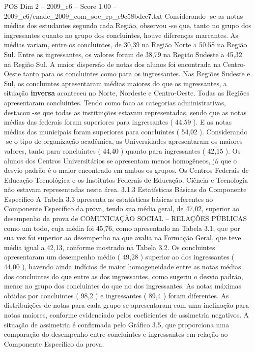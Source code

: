 \begin{textsample}{POS Dim 2 – 2009\_c6 – Score 1.00 – 2009\_c6/enade\_2009\_com\_soc\_rp\_c9c58bdcc7.txt}
Considerando -se as notas médias dos estudantes segundo cada Região, observou -se que, tanto no grupo dos ingressantes quanto no grupo dos concluintes, houve diferenças marcantes.
As médias variam, entre os concluintes, de 30,39 na Região Norte a 50,58 na Região Sul.
Entre os ingressantes, os valores foram de 38,79 na Região Sudeste a 45,32 na Região Sul.
A maior dispersão de notas dos alunos foi encontrada na Centro-Oeste tanto para os concluintes como para os ingressantes.
Nas Regiões Sudeste e Sul, os concluintes apresentaram médias maiores do que os ingressantes, a situação \textbf{inversa} aconteceu no Norte, Nordeste e Centro-Oeste.
Todas as Regiões apresentaram concluintes.
Tendo como foco as categorias administrativas, destacou -se que todas as instituições estavam representadas, sendo que as notas médias das federais foram superiores para ingressantes ( 44,59 ).
E as notas médias das municipais foram superiores para concluintes ( 54,02 ).
Considerando -se o tipo de organização acadêmica, as Universidades apresentaram os maiores valores, tanto para concluintes ( 44,40 ) quanto para ingressantes ( 42,15 ).
Os alunos dos Centros Universitários se apresentam menos homogêneos, já que o desvio padrão é o maior encontrado em ambos os grupos.
Os Centros Federais de Educação Tecnológica e os Institutos Federais de Educação, Ciência e Tecnologia não estavam representadas nesta área. 3.1.3 Estatísticas Básicas do Componente Específico A Tabela 3.3 apresenta as estatísticas básicas referentes ao Componente Específico da prova, tendo sua média geral, de 47,02, superior ao desempenho da prova de COMUNICAÇÃO SOCIAL – RELAÇÕES PÚBLICAS como um todo, cuja média foi 45,76, como apresentado na Tabela 3.1, que por sua vez foi superior ao desempenho na que avalia na Formação Geral, que teve média igual a 42,13, conforme mostrado na Tabela 3.2.
Os concluintes apresentaram um desempenho médio ( 49,28 ) superior ao dos ingressantes ( 44,00 ), havendo ainda indícios de maior homogeneidade entre as notas médias dos concluintes do que entre as dos ingressantes, como sugeriu o desvio padrão, menor no grupo dos concluintes do que no dos ingressantes.
As notas máximas obtidas por concluintes ( 98,2 ) e ingressantes ( 89,4 ) foram diferentes.
As distribuições de notas para cada grupo se apresentaram com uma inclinação para notas maiores, conforme evidenciado pelos coeficientes de assimetria negativos.
A situação de assimetria é confirmada pelo Gráfico 3.5, que proporciona uma comparação do desempenho entre concluintes e ingressantes em relação ao Componente Específico da prova.

\end{textsample}
